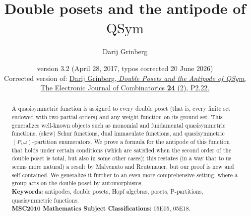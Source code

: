 \documentclass[numbers=enddot,12pt,final,onecolumn,notitlepage,abstracton]{scrartcl}
\theoremstyle{definition}
\newcommand{\QSym}{{\operatorname{QSym}}}
\begin{document}
\author{Darij Grinberg}

\title{Double posets and the antipode of $\QSym$}

\date{version 3.2 (April 28, 2017, typos corrected 20 June 2026) \\[1pc]
Corrected version of:
\href{https://doi.org/10.37236/6660}{%
Darij Grinberg, \textit{Double Posets and the Antipode of QSym},
The Electronic Journal of Combinatorics \textbf{24} (2), P2.22.}
}

\maketitle

\begin{abstract}
A quasisymmetric function is assigned to every double poset (that is,
every finite set endowed with two partial orders) and any weight function
on its ground set. This generalizes well-known objects such as monomial
and fundamental quasisymmetric functions, (skew) Schur functions, dual
immaculate functions, and quasisymmetric
$\left(P, \omega\right)$-partition enumerators.
We prove a formula for the antipode of this function that
holds under certain conditions (which are satisfied when the second order
of the double poset is total, but also in some other cases); this
restates (in a way that to us seems more natural) a
result by Malvenuto and Reutenauer, but our proof is new and
self-contained. We generalize it further to an even more comprehensive
setting, where a group acts on the double poset by automorphisms.
\\[0.2pc]

\textbf{Keywords:}
antipodes,
double posets,
Hopf algebras,
posets,
P-partitions,
quasisymmetric functions.
\\[0.2pc]

\textbf{MSC2010 Mathematics Subject Classifications:}
05E05, 05E18.
\end{abstract}

\end{document}

